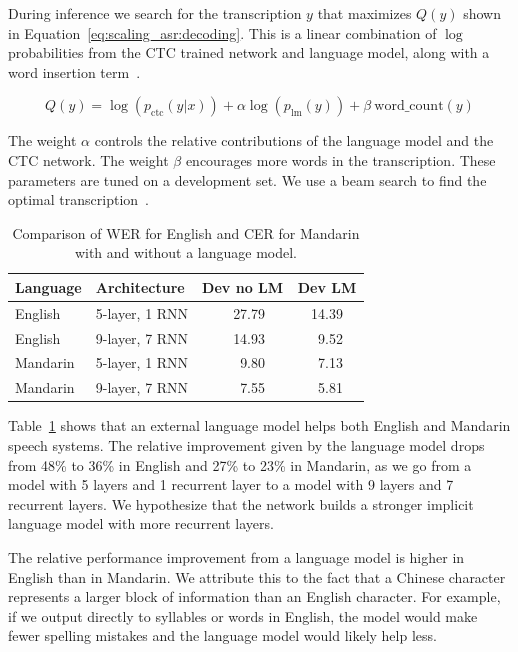 During inference we search for the transcription $y$ that maximizes $Q(y)$
shown in Equation~\ref{eq:scaling_asr:decoding}. This is a linear combination
of $\log$ probabilities from the CTC trained network and language model, along
with a word insertion term~\cite{hannun2014deepspeech}. 

\begin{equation}
\label{eq:scaling_asr:decoding}
Q(y) = \log (p_{\textrm{ctc}}(y|x)) + \alpha \log(p_{\textrm{lm}}(y))  + \beta \: \textrm{word\_count}(y)
\end{equation}

The weight $\alpha$ controls the relative contributions of the language model
and the CTC network. The weight $\beta$ encourages more words in the
transcription. These parameters are tuned on a development set. We use a beam
search to find the optimal transcription~\cite{hannun2014firstpass}.

\begin{table}
\centering
\begin{tabular}{l  l  r r r r r r}
\toprule
Language & Architecture & \multicolumn{3}{c}{Dev no LM} & \multicolumn{3}{c}{Dev LM} \\
\midrule
English  & 5-layer, 1 RNN & & 27.79 & & & 14.39 & \\
English  & 9-layer, 7 RNN & & 14.93 & & & 9.52 & \\
Mandarin & 5-layer, 1 RNN & & 9.80  & & & 7.13 & \\
Mandarin & 9-layer, 7 RNN & & 7.55  & & & 5.81 & \\
\bottomrule
\end{tabular}
\caption{Comparison of WER for English and CER for Mandarin with and without a
         language model.}
\label{table:scaling_asr:languagemodels}
\end{table}

Table~\ref{table:scaling_asr:languagemodels} shows that an external language
model helps both English and Mandarin speech systems. The relative improvement
given by the language model drops from 48\% to 36\% in English and 27\% to 23\%
in Mandarin, as we go from a model with 5 layers and 1 recurrent layer to a
model with 9 layers and 7 recurrent layers. We hypothesize that the network
builds a stronger implicit language model with more recurrent layers. 

The relative performance improvement from a language model is higher in English
than in Mandarin. We attribute this to the fact that a Chinese character
represents a larger block of information than an English character. For
example, if we output directly to syllables or words in English, the model
would make fewer spelling mistakes and the language model would likely help
less.

